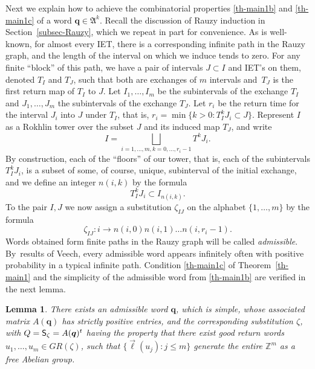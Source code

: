 \documentclass[JEP,XML,SOM,Unicode]{cedram}
\newcommand{\sep}{:}
\theoremstyle{plain}
\newtheorem{lemma}[theorem]{Lemma}
\theoremstyle{definition}
\newcommand \q {{\boldsymbol q}}
\newcommand\bq{{\boldsymbol q}}
\newcommand\FrA{\mathfrak{A}}
\newcommand{\Z}{\mathbb{Z}}
\newcommand\Sf{{\sf S}}
\begin{document}
Next we explain how to achieve the combinatorial properties \eqref{th-main1b} and \eqref{th-main1c} of a word $\bq\in \FrA^k$. Recall the discussion of Rauzy induction in Section~\ref{subsec-Rauzy}, which we repeat in part for convenience.
As is well-known, for almost every IET, there is a corresponding infinite path in the Rauzy graph, and the length of the interval on which we induce tends to zero. For any finite ``block'' of this path, we
have a pair of intervals $J\subset I$ and IET's on them, denoted $T_I$ and $T_J$, such that both are
exchanges of $m$ intervals and~$T_J$ is the first return map of $T_I$ to $J$. Let $I_1, \dots, I_m$ be the subintervals of the exchange $T_I$ and $J_1, \dots, J_m$ the subintervals of the exchange $T_J$.
Let $r_i$ be the return time for the interval $J_i$ into $J$ under $T_I$, that is,
$
r_i=\min\{ k>0: T_I^kJ_i\subset J\}.
$
Represent $I$ as a Rokhlin tower over the subset $J$ and its induced map $T_J$, and write
\[
I=\bigsqcup\limits_{i=1,\dots, m, k=0, \dots, r_i-1} T^{k}J_i.
\]
By construction, each of the ``floors'' of our tower, that is, each of the subintervals $T_I^{k}J_i$, is a subset of some, of course, unique, subinterval of the initial exchange, and we define an integer $n(i,k)$ by the formula
\[
T_I^{k}J_i\subset I_{n(i,k)}.
\]
To the pair $I,J$ we now assign a substitution $\zeta_{IJ}$ on the alphabet
$\{1, \dots, m\}$ by the formula
\begin{equation} \label{zeta-def}
\zeta_{IJ}: i\to n(i,0)n(i,1)\dots n(i, r_i-1).
\end{equation}
Words obtained form finite paths in the Rauzy graph will be called \emph{admissible}. By~\hbox{results} of Veech, every admissible word appears infinitely often with positive probability in a typical infinite path. Condition \eqref{th-main1c} of Theorem~\ref{th-main1} and the simplicity of the admissible word from \eqref{th-main1b} are verified in the next lemma.
\begin{lemma} \label{lem-combi1}
There exists an admissible word $\bq$, which is \emph{simple}, whose associated matrix $A(\q)$ has strictly positive entries, and the corresponding substitution $\zeta$, with $Q = \Sf_\zeta=A(\q)^t$ having the property that there exist \emph{good return words}
$u_1,\ldots,u_m\in GR(\zeta)$, such that $\{\vec{\ell}(u_j)\sep j\le m\}$ generate the entire
$\Z^m$ as a free Abelian group.
\end{lemma}
\end{document}
